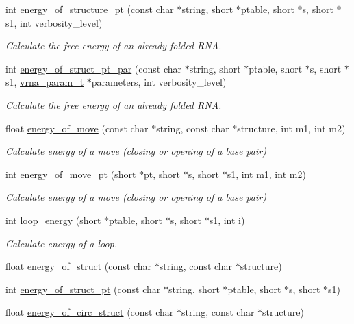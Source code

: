 \begin{DoxyCompactItemize}
int \hyperlink{group__eval_ga8831445966b761417e713360791299d8}{energy\+\_\+of\+\_\+structure\+\_\+pt} (const char $\ast$string, short $\ast$ptable, short $\ast$s, short $\ast$s1, int verbosity\+\_\+level)
\begin{DoxyCompactList}\small\item\em Calculate the free energy of an already folded R\+NA. \end{DoxyCompactList}\item 
int \hyperlink{group__eval_ga49acb3d5627dc6823a7ce12d116d4c69}{energy\+\_\+of\+\_\+struct\+\_\+pt\+\_\+par} (const char $\ast$string, short $\ast$ptable, short $\ast$s, short $\ast$s1, \hyperlink{group__energy__parameters_ga8a69ca7d787e4fd6079914f5343a1f35}{vrna\+\_\+param\+\_\+t} $\ast$parameters, int verbosity\+\_\+level)
\begin{DoxyCompactList}\small\item\em Calculate the free energy of an already folded R\+NA. \end{DoxyCompactList}\item 
float \hyperlink{group__eval_ga539ecaed89730f7644c202f304d7529b}{energy\+\_\+of\+\_\+move} (const char $\ast$string, const char $\ast$structure, int m1, int m2)
\begin{DoxyCompactList}\small\item\em Calculate energy of a move (closing or opening of a base pair) \end{DoxyCompactList}\item 
int \hyperlink{group__eval_ga49e0ee561be69faf0568213546f6a53f}{energy\+\_\+of\+\_\+move\+\_\+pt} (short $\ast$pt, short $\ast$s, short $\ast$s1, int m1, int m2)
\begin{DoxyCompactList}\small\item\em Calculate energy of a move (closing or opening of a base pair) \end{DoxyCompactList}\item 
int \hyperlink{group__eval_ga507d4fd93f4b398d793ba2402731388d}{loop\+\_\+energy} (short $\ast$ptable, short $\ast$s, short $\ast$s1, int i)
\begin{DoxyCompactList}\small\item\em Calculate energy of a loop. \end{DoxyCompactList}\item 
float \hyperlink{group__eval_gac2b37fea2145c94d925a3f33378ef87b}{energy\+\_\+of\+\_\+struct} (const char $\ast$string, const char $\ast$structure)
\item 
int \hyperlink{group__eval_ga27ce6f68512d43bf1fe14a06c9d76d5c}{energy\+\_\+of\+\_\+struct\+\_\+pt} (const char $\ast$string, short $\ast$ptable, short $\ast$s, short $\ast$s1)
\item 
float \hyperlink{group__eval_ga657222e2758c46bf13b416ef3032e417}{energy\+\_\+of\+\_\+circ\+\_\+struct} (const char $\ast$string, const char $\ast$structure)
\end{DoxyCompactItemize}

